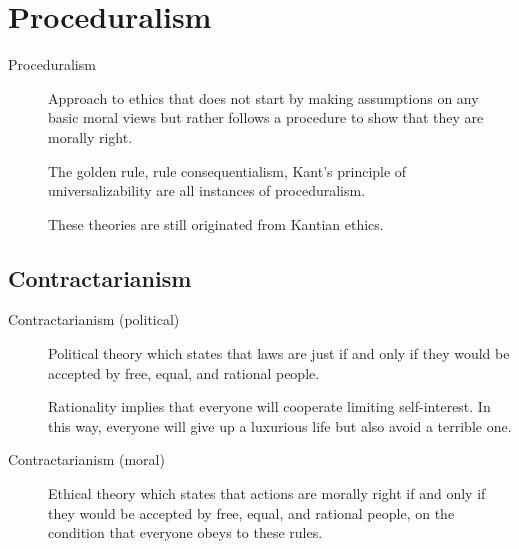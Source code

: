 \section{Proceduralism}

\begin{description}
    \item[Proceduralism] 
        Approach to ethics that does not start by making assumptions on any basic moral views but rather follows a procedure to show that they are morally right.

        \begin{remark}
            The golden rule, rule consequentialism, Kant's principle of universalizability are all instances of proceduralism.
        \end{remark}

        \begin{remark}
            These theories are still originated from Kantian ethics.
        \end{remark}
\end{description}


\subsection{Contractarianism}

\begin{description}
    \item[Contractarianism (political)] 
        Political theory which states that laws are just if and only if they would be accepted by free, equal, and rational people.

        \begin{remark}
            Rationality implies that everyone will cooperate limiting self-interest. In this way, everyone will give up a luxurious life but also avoid a terrible one.
        \end{remark}

    \item[Contractarianism (moral)] 
        Ethical theory which states that actions are morally right if and only if they would be accepted by free, equal, and rational people, on the condition that everyone obeys to these rules.
\end{description}

